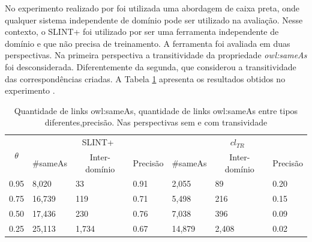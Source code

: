 No experimento realizado por  foi utilizada uma abordagem de caixa preta, onde qualquer sistema independente de domínio pode ser utilizado na avaliação. Nesse contexto, o SLINT+ \cite{nguyen2012interlinking} foi utilizado por ser uma ferramenta independente de domínio e que não precisa de treinamento. A ferramenta foi avaliada em duas perspectivas. Na primeira perspectiva a transitividade da propriedade \textit{owl:sameAs} foi desconsiderada. Diferentemente da segunda, que considerou a transitividade das correspondências criadas. A Tabela \ref{tab:homoceanu2014putting} apresenta os resultados obtidos no experimento \cite{homoceanu2014putting}.

\begin{table}[h]
	\centering
	\caption{Quantidade de links owl:sameAs, quantidade de links owl:sameAs entre tipos diferentes,precisão. Nas perspectivas sem e com transividade}
	\label{tab:homoceanu2014putting}
	\begin{tabular}{@{}l|lll|lll@{}}
		\toprule
		\multicolumn{1}{c|}{\multirow{2}{*}{$\theta$}} & \multicolumn{3}{c|}{SLINT+}                                                                      & \multicolumn{3}{c}{$cl_{TR}$}                                                                  \\
		\multicolumn{1}{c|}{}                        & \multicolumn{1}{c}{\#sameAs} & \multicolumn{1}{c}{Inter-domínio} & \multicolumn{1}{c|}{Precisão} & \multicolumn{1}{c}{\#sameAs} & \multicolumn{1}{c}{Inter-domínio} & \multicolumn{1}{c}{Precisão} \\ \midrule
		0.95                                         & 8,020                        & 33                                & 0.91                          & 2,055                        & 89                                & 0.20                         \\
		0.75                                         & 16,739                       & 119                               & 0.71                          & 5,498                        & 216                               & 0.15                         \\
		0.50                                         & 17,436                       & 230                               & 0.76                          & 7,038                        & 396                               & 0.09                         \\
		0.25                                         & 25,113                       & 1,734                             & 0.67                          & 14,879                       & 2,408                             & 0.02                         \\ \bottomrule
	\end{tabular}
\end{table}



